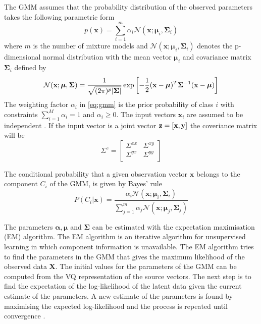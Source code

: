 The GMM assumes that the probability distribution of the observed parameters takes the following parametric form
\newcommand{\nnn}{\mathcal N}
\begin{equation}
	\label{eq:gmm}
	p(\mathbf{x}) = \sum_{i=1}^{m} \alpha_i \nnn(\mathbf{x}; \boldsymbol{\mu}_i, \mathbf{\Sigma}_i)
\end{equation}
where $m$ is the number of mixture models and $\nnn(\mathbf{x}; \boldsymbol{\mu}_i, \mathbf{\Sigma}_i)$ denotes the p-dimensional normal distribution \cite{statistikk} with the mean vector $\boldsymbol{\mu}_i$ and covariance matrix $\mathbf{\Sigma}_i$ defined by
\begin{equation}
	\nnn(\mathbf{x}; \boldsymbol{\mu}, \mathbf{\Sigma}) = \frac{1}{\sqrt{(2\pi)^p\abs{\mathbf{\Sigma}}}} \exp\sbrackets{-\frac{1}{2} (\mathbf{x} -\boldsymbol{\mu})^T \mathbf{\Sigma}^{-1} (\mathbf{x} -\boldsymbol{\mu})}
\end{equation}
The weighting factor $\alpha_i$ in \eqref{eq:gmm} is the prior probability of class $i$ with constraints $\sum_{i=1}^{M}\alpha_i = 1$ and $\alpha_i \geq 0$. The input vectors $\mathbf{x}_i$ are assumed to be independent \cite{stylianou98}. If the input vector is a joint vector $\mathbf{z}=\left[\mathbf{x},\mathbf{y}\right]$ the coveriance matrix will be
\begin{equation}
	\Sigma^z = \begin{bmatrix}
		\Sigma^{xx} & \Sigma^{xy} \\
		\Sigma^{yx} & \Sigma^{yy} \\
	\end{bmatrix}
\end{equation}

The conditional probability that a given observation vector $\mathbf{x}$ belongs to the component $C_i$ of the GMM, is given by Bayes' rule \cite{statistikk}
\begin{equation}
	\label{eq:bayes}
	P(C_i\vert \mathbf{x}) = \frac{\alpha_i \nnn(\mathbf{x}; \boldsymbol{\mu}_i, \mathbf{\Sigma}_i)}{\sum_{j=1}^{m}\alpha_j \nnn(\mathbf{x}; \boldsymbol{\mu}_j, \mathbf{\Sigma}_j)}
\end{equation}

The parameters $\boldsymbol{\alpha}, \boldsymbol{\mu}$ and $ \mathbf{\Sigma}$ can be estimated with the expectation maximisation (EM) algorithm. The EM algorithm is an iterative algorithm for unsupervised learning in which component information is unavailable. The EM algorithm tries to find the parameters in the GMM that gives the maximum likelihood of the observed data $\mathbf{X}$. The initial values for the parameters of the GMM can be computed from the VQ representation of the source vectors. The next step is to find the expectation of the log-likelihood of the latent data given the current estimate of the parameters. A new estimate of the parameters is found by maximising the expected log-likelihood and the process is repeated until convergence \cite{taletek}.

